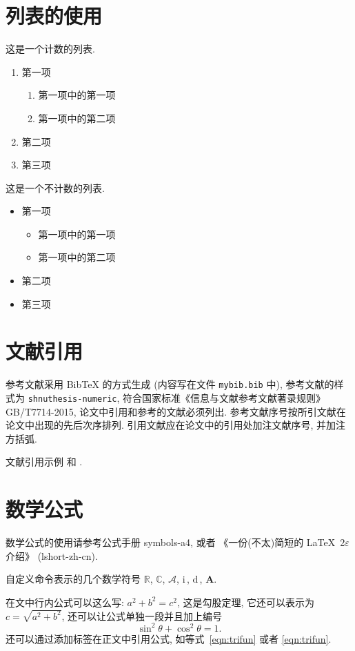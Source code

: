 \documentclass[master]{shnuthesis}
\newcommand{\CC}{\ensuremath{\mathbb{C}}}
\newcommand{\RR}{\ensuremath{\mathbb{R}}}
\newcommand{\A}{\mathcal{A}}
\newcommand{\ii}{\mathrm{i}\,}  %
\newcommand{\md}{\mathrm{d}\,}
\newcommand{\bA}{\boldsymbol{A}}
\begin{document}
\section{列表的使用}

这是一个计数的列表.
\begin{enumerate}%
	\item 第一项
		\begin{enumerate}
			\item 第一项中的第一项
			\item 第一项中的第二项
		\end{enumerate}
	\item 第二项
	\item 第三项
\end{enumerate}

这是一个不计数的列表.
\begin{itemize}%
	\item 第一项
	\begin{itemize}
		\item 第一项中的第一项
		\item 第一项中的第二项
	\end{itemize}
	\item 第二项
	\item 第三项
\end{itemize}


\section{文献引用}

参考文献采用 BibTeX 的方式生成 (内容写在文件 \verb|mybib.bib| 中), 参考文献的样式为 \verb|shnuthesis-numeric|, 符合国家标准《信息与文献参考文献著录规则》GB/T7714-2015, 论文中引用和参考的文献必须列出. 参考文献序号按所引文献在论文中出现的先后次序排列. 引用文献应在论文中的引用处加注文献序号, 并加注方括弧.

文献引用示例 \cite{LiLiu1997} 和 \cite{Adams2003,Shen1994}.


\section{数学公式}

数学公式的使用请参考公式手册 symbols-a4, 或者 《一份(不太)简短的 \LaTeX~2$\varepsilon$ 介绍》 (lshort-zh-cn).

自定义命令表示的几个数学符号 $\RR$, $\CC$, $\A$, $\ii$, $\md$, $\bA$.

在文中行内公式可以这么写: $a^2+b^2=c^2$, 这是勾股定理, 它还可以表示为 $c=\sqrt{a^2+b^2}$, 还可以让公式单独一段并且加上编号
\begin{equation}\label{eqn:trifun}
\sin^2{\theta}+\cos^2{\theta}=1.
\end{equation}
还可以通过添加标签在正文中引用公式, 如等式~\eqref{eqn:trifun} 或者 \ref{eqn:trifun}.
\end{document}
